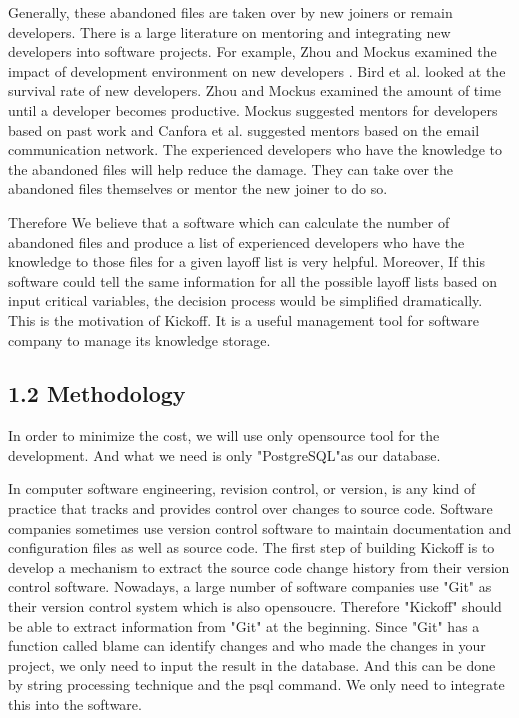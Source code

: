 \documentclass[11pt, a4paper, openright]{report}
\begin{document}
Generally, these abandoned files are taken over by new joiners or remain developers. There is a large literature on mentoring and integrating new developers into software projects. For example, Zhou and Mockus examined the impact of development environment on new developers\cite{Zhou2011ICSE} . Bird et al. \cite{Bird2007MSR} looked at the survival rate of new developers. Zhou and Mockus examined the amount of time until a developer becomes productive. Mockus \cite{Mockus2010FSE} suggested mentors for developers based on past work and Canfora et al. \cite{Canfora2012FSE} suggested mentors based on the email communication network. The experienced developers who have the knowledge to the abandoned files will help reduce the damage. They can take over the abandoned files themselves or mentor the new joiner to do so.


Therefore We believe that a software which can calculate the number of abandoned files and produce a list of experienced  developers who have the knowledge to those files for a given layoff list is very helpful. Moreover, If this software could tell the same information for all the possible 
layoff lists based on input critical variables, the decision process would be simplified dramatically. This is the motivation of Kickoff. It is a useful management tool for software company to manage its knowledge storage.




\subsection*{1.2 Methodology}

In order to minimize the cost, we will use only opensource tool for the development. And what we need is only "PostgreSQL"as our database.

In computer software engineering, revision control, or version, is any kind of practice that tracks and provides control over changes to source code. Software companies sometimes use version control software to maintain documentation and configuration files as well as source code.
The first step of building Kickoff is to develop a mechanism to extract the source code change history from their version control software. Nowadays, a large number of software companies use "Git" as their version control system which is also opensoucre. Therefore "Kickoff" should be able to extract information from "Git" at the beginning. Since "Git" has a function called blame can identify changes and who made the changes in your project, we only need to input the result in the database. And this can be done by string processing technique and the psql command. We only need to integrate this into the software.    
\end{document}
